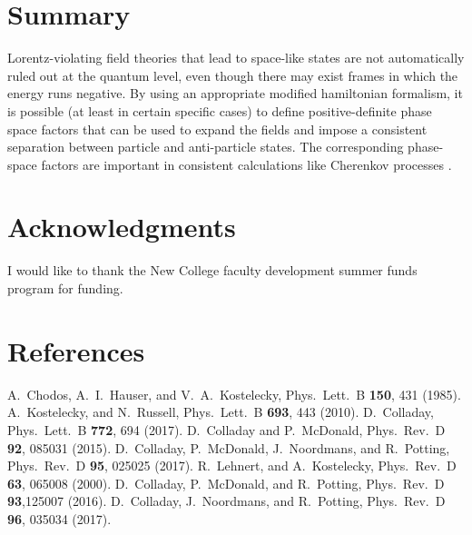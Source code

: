 \documentclass[a4paper]{jpconf}
\begin{document}
\section{Summary}
Lorentz-violating field theories that lead to space-like states are not automatically ruled out
at the quantum level, even though there may exist
frames in which the energy runs negative.
By using an appropriate modified hamiltonian formalism, it is possible (at least in certain specific cases) to define positive-definite phase space factors that can be used to expand the fields
and impose a consistent separation between particle and anti-particle states.
The corresponding phase-space factors are important in consistent calculations like Cherenkov
processes \cite{potting1,potting2}.

\section{Acknowledgments}
I would like to thank the New College faculty development summer funds program for 
funding. 

\section*{References}
\begin{thebibliography}{9}
A.\ Chodos, A.\ I.\ Hauser, and V.\ A.\ Kostelecky,
Phys.\ Lett.\ B {\bf 150}, 431 (1985).
A.\ Kostelecky, and N.\ Russell,
Phys.\ Lett.\ B {\bf 693}, 443 (2010).
D.\ Colladay,
Phys.\ Lett.\ B {\bf 772}, 694 (2017).
D.\ Colladay and P.\ McDonald,
Phys.\ Rev.\ D {\bf 92}, 085031 (2015).
D.\ Colladay, P.\ McDonald, J.\ Noordmans, and R.\ Potting,
Phys.\ Rev.\ D {\bf 95}, 025025 (2017). 
R.\ Lehnert, and A.\ Kostelecky,
Phys.\ Rev.\ D {\bf 63}, 065008 (2000).
D.\ Colladay, P.\ McDonald, and R.\ Potting,
Phys.\ Rev.\ D {\bf 93},125007 (2016).
D.\ Colladay, J.\ Noordmans, and R.\ Potting,
Phys.\ Rev.\ D {\bf 96}, 035034 (2017).

\end{thebibliography}
\end{document}
